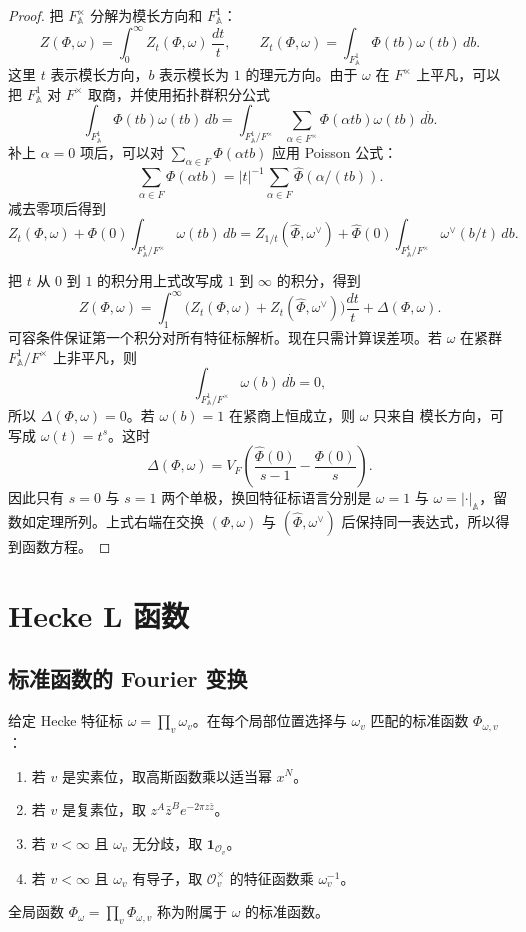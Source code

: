 \documentclass[11pt,a4paper,openany]{ctexbook}
\numberwithin{equation}{chapter}
\newcommand{\A}{\mathbb{A}}
\theoremstyle{plain}
\theoremstyle{definition}
\theoremstyle{remark}
\begin{document}
\begin{proof}
把 $F_{\A}^{\times}$ 分解为模长方向和 $F_{\A}^{1}$：
\[
  Z(\Phi,\omega)=\int_0^\infty Z_t(\Phi,\omega)\,\frac{dt}{t},
\qquad
  Z_t(\Phi,\omega)=\int_{F_{\A}^{1}}\Phi(tb)\omega(tb)\,db.
\]
这里 $t$ 表示模长方向，$b$ 表示模长为 $1$ 的理元方向。由于 $\omega$ 在
$F^\times$ 上平凡，可以把 $F_{\A}^{1}$ 对 $F^\times$ 取商，并使用拓扑群积分公式
\[
  \int_{F_{\A}^{1}}\Phi(tb)\omega(tb)\,db
  =
  \int_{F_{\A}^{1}/F^\times}
  \sum_{\alpha\in F^\times}\Phi(\alpha tb)\omega(tb)\,d\dot b.
\]
补上 $\alpha=0$ 项后，可以对 $\sum_{\alpha\in F}\Phi(\alpha tb)$ 应用 Poisson 公式：
\[
  \sum_{\alpha\in F}\Phi(\alpha tb)
  =
  |t|^{-1}\sum_{\alpha\in F}\widehat\Phi(\alpha/(tb)).
\]
减去零项后得到
\[
  Z_t(\Phi,\omega)+\Phi(0)\int_{F_{\A}^{1}/F^\times}\omega(tb)\,db
  =
  Z_{1/t}(\widehat\Phi,\omega^\vee)
  +
  \widehat\Phi(0)\int_{F_{\A}^{1}/F^\times}\omega^\vee(b/t)\,db .
\]

把 $t$ 从 $0$ 到 $1$ 的积分用上式改写成 $1$ 到 $\infty$ 的积分，得到
\[
  Z(\Phi,\omega)=
  \int_1^\infty\bigl(Z_t(\Phi,\omega)+Z_t(\widehat\Phi,\omega^\vee)\bigr)\frac{dt}{t}
  +\Delta(\Phi,\omega).
\]
可容条件保证第一个积分对所有特征标解析。现在只需计算误差项。若 $\omega$ 在紧群
$F_{\A}^{1}/F^\times$ 上非平凡，则
\[
  \int_{F_{\A}^{1}/F^\times}\omega(b)\,d\dot b=0,
\]
所以 $\Delta(\Phi,\omega)=0$。若 $\omega(b)=1$ 在紧商上恒成立，则 $\omega$ 只来自
模长方向，可写成 $\omega(t)=t^s$。这时
\[
  \Delta(\Phi,\omega)=
  V_F\left(\frac{\widehat\Phi(0)}{s-1}-\frac{\Phi(0)}{s}\right).
\]
因此只有 $s=0$ 与 $s=1$ 两个单极，换回特征标语言分别是 $\omega=1$ 与
$\omega=|\cdot|_{\A}$，留数如定理所列。上式右端在交换
$(\Phi,\omega)$ 与 $(\widehat\Phi,\omega^\vee)$ 后保持同一表达式，所以得到函数方程。
\end{proof}

\section{Hecke L 函数}

\subsection{标准函数的 Fourier 变换}

给定 Hecke 特征标 $\omega=\prod_v\omega_v$。在每个局部位置选择与 $\omega_v$ 匹配的标准函数 $\Phi_{\omega,v}$：
\begin{enumerate}[label=(\arabic*)]
\item 若 $v$ 是实素位，取高斯函数乘以适当幂 $x^N$。
\item 若 $v$ 是复素位，取 $z^A\bar z^B e^{-2\pi z\bar z}$。
\item 若 $v<\infty$ 且 $\omega_v$ 无分歧，取 $\mathbf 1_{\mathcal O_v}$。
\item 若 $v<\infty$ 且 $\omega_v$ 有导子，取 $\mathcal O_v^\times$ 的特征函数乘 $\omega_v^{-1}$。
\end{enumerate}
全局函数 $\Phi_\omega=\prod_v\Phi_{\omega,v}$ 称为附属于 $\omega$ 的标准函数。
\end{document}

